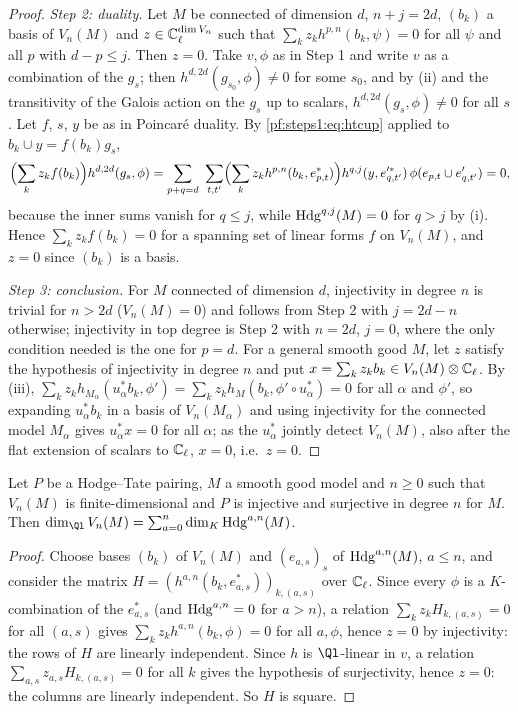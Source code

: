 \begin{proof}
\emph{Step 2: duality.} Let $M$ be connected of dimension $d$, $n+j=2d$, $(b_k)$ a basis of $V_n(M)$ and $z\in\mathbb{C}_\ell^{\dim V_n}$
such that $\sum_kz_kh^{p,n}(b_k,\psi)=0$ for all $\psi$ and all $p$ with $d-p\le j$. Then $z=0$. Take $v,\phi$ as in Step 1 and
write $v$ as a combination of the $g_s$; then $h^{d,2d}(g_{s_0},\phi)\ne0$ for some $s_0$, and by (ii) and the transitivity of the
Galois action on the $g_s$ up to scalars, $h^{d,2d}(g_s,\phi)\ne0$ for all $s$. Let $f$, $s$, $y$ be as in Poincar\'e duality.
By \eqref{pf:steps1:eq:htcup} applied to $b_k\cup y=f(b_k)g_s$,
\[
 \Bigl(\sum_kz_kf(b_k)\Bigr)h^{d,2d}(g_s,\phi)=\sum_{p+q=d}\ \sum_{t,t'}\Bigl(\sum_kz_kh^{p,n}(b_k,e^*_{p,t})\Bigr)h^{q,j}(y,e'^*_{q,t'})\,
 \phi(e_{p,t}\cup e'_{q,t'})=0,
\]
because the inner sums vanish for $q\le j$, while $\mathrm{Hdg}^{q,j}(M)=0$ for $q>j$ by (i). Hence $\sum_kz_kf(b_k)=0$ for a
spanning set of linear forms $f$ on $V_n(M)$, and $z=0$ since $(b_k)$ is a basis.

\emph{Step 3: conclusion.} For $M$ connected of dimension $d$, injectivity in degree $n$ is trivial for $n>2d$ ($V_n(M)=0$) and
follows from Step 2 with $j=2d-n$ otherwise; injectivity in top degree is Step 2 with $n=2d$, $j=0$, where the only
condition needed is the one for $p=d$. For a general smooth good $M$, let $z$ satisfy the hypothesis of injectivity in degree
$n$ and put $x=\sum_kz_kb_k\in V_n(M)\otimes\mathbb{C}_\ell$. By (iii), $\sum_kz_kh_{M_\alpha}(u_\alpha^*b_k,\phi')=
\sum_kz_kh_M(b_k,\phi'\circ u_\alpha^*)=0$ for all $\alpha$ and $\phi'$, so expanding $u_\alpha^*b_k$ in a basis of
$V_n(M_\alpha)$ and using injectivity for the connected model $M_\alpha$ gives $u_\alpha^*x=0$ for all $\alpha$; as the
$u_\alpha^*$ jointly detect $V_n(M)$, also after the flat extension of scalars to $\mathbb{C}_\ell$, $x=0$, i.e.\ $z=0$.
\end{proof}

\begin{lemma}\label{pf:steps1:rank}
Let $P$ be a Hodge--Tate pairing, $M$ a smooth good model and $n\ge0$ such that $V_n(M)$ is finite-dimensional and $P$ is
injective and surjective in degree $n$ for $M$. Then $\dim_{\Ql}V_n(M)=\sum_{a=0}^n\dim_K\stepsIHdg^{a,n}(M)$.
\end{lemma}

\begin{proof}
Choose bases $(b_k)$ of $V_n(M)$ and $(e_{a,s})_s$ of $\mathrm{Hdg}^{a,n}(M)$, $a\le n$, and consider the matrix
$H=(h^{a,n}(b_k,e^*_{a,s}))_{k,(a,s)}$ over $\mathbb{C}_\ell$. Since every $\phi$ is a $K$-combination of the $e^*_{a,s}$ (and
$\mathrm{Hdg}^{a,n}=0$ for $a>n$), a relation $\sum_kz_kH_{k,(a,s)}=0$ for all $(a,s)$ gives $\sum_kz_kh^{a,n}(b_k,\phi)=0$ for all
$a,\phi$, hence $z=0$ by injectivity: the rows of $H$ are linearly independent. Since $h$ is $\Ql$-linear in $v$, a relation
$\sum_{a,s}z_{a,s}H_{k,(a,s)}=0$ for all $k$ gives the hypothesis of surjectivity, hence $z=0$: the columns are linearly
independent. So $H$ is square.
\end{proof}


